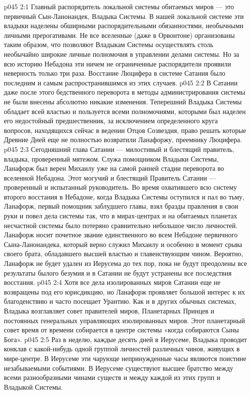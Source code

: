 \vs p045 2:1 Главный распорядитель локальной системы обитаемых миров --- это первичный Сын\hyp{}Ланонандек, Владыка Системы. В нашей локальной системе эти владыки наделены обширными распорядительными обязанностями, необычными личными прерогативами. Не все вселенные (даже в Орвонтоне) организованы таким образом, что позволяют Владыкам Системы осуществлять столь необычайно широкие личные полномочия в управлении делами системы. Но за всю историю Небадона эти ничем не ограниченные распорядители проявили неверность только три раза. Восстание Люцифера в системе Сатания было последним и самым распространившимся из этих случаев.
\vs p045 2:2 В Сатании даже после этого бедственного переворота в методы администрирования системы не были внесены абсолютно никакие изменения. Теперешний Владыка Системы обладает всей властью и пользуется всеми полномочиями, которыми был наделен его недостойный предшественник, за исключением определенного круга вопросов, находящихся сейчас в ведении Отцов Созвездия, право решать которые Древние Дней еще не полностью возвратили Ланафоржу, преемнику Люцифера.
\vs p045 2:3 \pc Сегодняшний глава Сатании --- милостивый и блестящий правитель, владыка, проверенный мятежом. Служа помощником Владыки Системы, Ланафорж был верен Михаилу уже на самой ранней стадии переворота во вселенной Небадона. Этот могучий и блестящий Правитель Сатании --- проверенный и испытанный руководитель. Во время охватившего всю систему второго восстания в Небадоне, когда Владыка Системы оступился и пал во тьму, Ланафорж, первый помощник заблудшего главы, взял бразды правления в свои руки и повел дела системы так, что в мирах\hyp{}центрах и на обитаемых планетах несчастной системы было потеряно сравнительно небольшое число личностей. Ланафорж носит почетное звание единственного во всем Небадоне первичного Сына\hyp{}Ланонандека, который верно служил Михаилу и особенно в момент срыва своего брата, обладавшего высшей властью и главенствующим чином. Вероятно, Ланафорж не будет удален из Иерусема до тех пор, пока не будут преодолены все результаты былого безумия и в Сатании не будут устранены все последствия восстания.
\vs p045 2:4 \pc Хотя все дела изолированных миров Сатании еще не возвращены под его юрисдикцию, но Ланафорж проявляет большой интерес к их благоденствию и часто посещает Урантию. Как и в других обычных системах, Владыка возглавляет совет правителей миров, Планетарных Принцев и постоянных генеральных управляющих изолированных миров. Этот планетарный совет время от времени собирается в центре системы «когда собираются Сыны Бога».
\vs p045 2:5 Раз в неделю, каждые десять дней в Иерусеме, Владыка проводит конклав с какой\hyp{}нибудь одной группой личностей различных чинов, живущих в мире\hyp{}центре. В Иерусеме эти чарующе непринужденные часы являются поистине незабываемыми событиями. В Иерусеме существуют высшее братство между всеми разнообразными чинами существ и между каждой из этих групп и Владыкой Системы.
